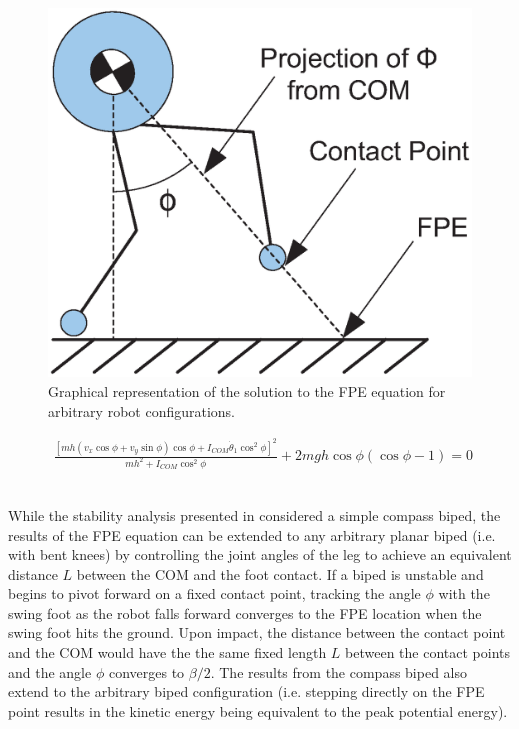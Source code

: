 \begin{figure}[!h]
	\centering
    \includegraphics[scale=0.6]{fig/simulations/fpeangle.eps}
  	\caption{Graphical representation of the solution to the FPE equation for arbitrary robot configurations.}
	\label{fig:fpeangle}
\end{figure}

\begin{figure}[!b]
	\begin{equation} \label{eq:fpe}
	\begin{aligned}
		\frac{{{{\left[ {mh({v_x}\cos \phi  + {v_y}\sin \phi )\cos \phi  + {I_{COM}}{{\dot \theta }_1}{{\cos }^2}\phi } \right]}^2}}}{{m{h^2} + {I_{COM}}{{\cos }^2}\phi }} + 2mgh\cos \phi (\cos \phi  - 1) = 0
	\end{aligned}
	\end{equation}
	\\
	\hrulefill
\end{figure}

While the stability analysis presented in \cite{Wight:2008ii} considered a simple compass biped, the results of the FPE equation can be extended to any arbitrary planar biped (i.e. with bent knees) by controlling the joint angles of the leg to achieve an equivalent distance $L$ between the COM and the foot contact. If a biped is unstable and begins to pivot forward on a fixed contact point, tracking the angle $\phi$ with the swing foot as the robot falls forward converges to the FPE location when the swing foot hits the ground. Upon impact, the distance between the contact point and the COM would have the the same fixed length $L$ between the contact points and the angle $\phi$ converges to $\beta/2$. The results from the compass biped also extend to the arbitrary biped configuration (i.e. stepping directly on the FPE point results in the kinetic energy being equivalent to the peak potential energy).

